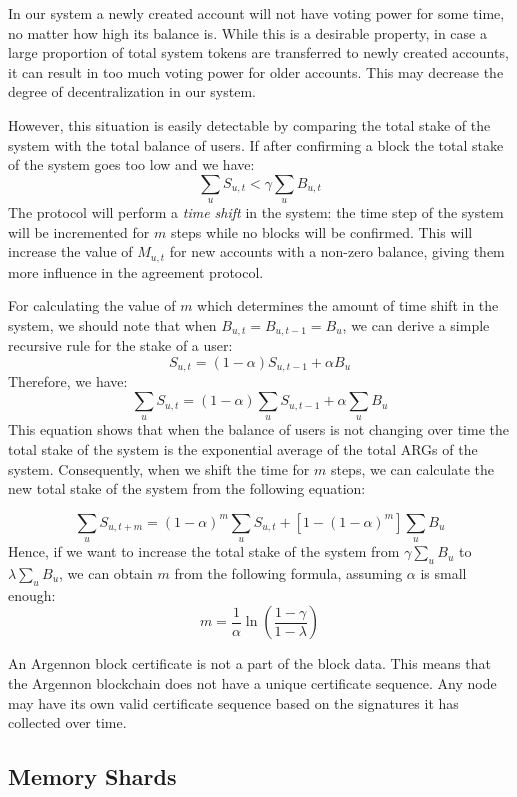 In our system a newly created account will not have voting power for some time, no matter how high its
balance is. While this is a desirable property, in case a large proportion of total system tokens are
transferred to newly created accounts, it can result in too much voting power for older accounts. This may decrease
the degree of decentralization in our system.

However, this situation is easily detectable by comparing the total stake of the system with the total balance of
users. If after confirming a block the total stake of the system goes too low and we have:
\[
    \sum_{u}S_{u,t} < \gamma \sum_{u}B_{u,t}
\]
The protocol will perform a \emph{time shift} in the system: the time step of the system
will be incremented for \(m\) steps while no blocks will be confirmed. This will increase the value of \(M_{u,t}\)
for new accounts with a non-zero balance, giving them more influence in the agreement protocol.

For calculating the value of \(m\) which determines the amount of time shift in the system, we should note that when
\(B_{u,t} = B_{u, t-1} = B_u\), we can derive a simple recursive rule for the stake of a user:
\[
    S_{u,t} = (1 - \alpha) S_{u,t-1} + \alpha B_u
\]
Therefore, we have:
\[
    \sum_{u}S_{u,t} = (1 - \alpha) \sum_{u}S_{u,t - 1} + \alpha \sum_{u}B_u
\]
This equation shows that when the balance of users is not changing over time the total stake of the system is the
exponential average of the total ARGs of the system. Consequently, when we shift the time for \(m\) steps, we can
calculate the new total stake of the system from the following equation:

\[
    \sum_{u}S_{u,t+m} = (1 - \alpha)^{m}\sum_{u}S_{u,t} + [1 - (1 - \alpha)^{m}]\sum_{u}B_u
\]
Hence, if we want to increase the total stake of the system from \(\gamma \sum_{u}B_u\) to \(\lambda \sum_{u}B_u\),
we can obtain \(m\) from the following formula, assuming \(\alpha\) is small enough:
\[
    m = \frac{1}{\alpha} \ln \left(\frac{1 - \gamma}{1 - \lambda}\right)
\]


An Argennon block certificate is not a part of the block data. This means that the Argennon blockchain does not have a
unique certificate sequence. Any node may have its own valid certificate sequence based on the signatures
it has collected over time.




\subsection{Memory Shards}\label{subsec:memory-shards}

